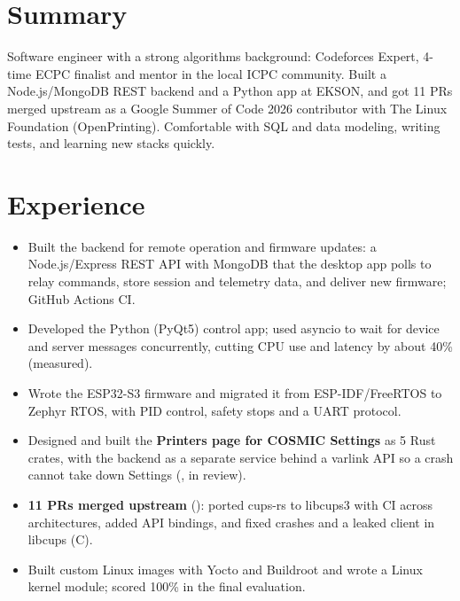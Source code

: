 \documentclass[10pt]{article}
\begin{document}

\section*{Summary}
Software engineer with a strong algorithms background: Codeforces Expert, 4-time ECPC finalist and mentor in the local ICPC community. Built a Node.js/MongoDB REST backend and a Python app at EKSON, and got 11 PRs merged upstream as a Google Summer of Code 2026 contributor with The Linux Foundation (OpenPrinting). Comfortable with SQL and data modeling, writing tests, and learning new stacks quickly.

\section*{Experience}
\begin{itemize}
  \item Built the backend for remote operation and firmware updates: a Node.js/Express REST API with MongoDB that the desktop app polls to relay commands, store session and telemetry data, and deliver new firmware; GitHub Actions CI.
  \item Developed the Python (PyQt5) control app; used asyncio to wait for device and server messages concurrently, cutting CPU use and latency by about 40\% (measured).
  \item Wrote the ESP32-S3 firmware and migrated it from ESP-IDF/FreeRTOS to Zephyr RTOS, with PID control, safety stops and a UART protocol.
\end{itemize}
\begin{itemize}
  \item Designed and built the \textbf{Printers page for COSMIC Settings} as 5 Rust crates, with the backend as a separate service behind a varlink API so a crash cannot take down Settings (, in review).
  \item \textbf{11 PRs merged upstream} (): ported cups-rs to libcups3 with CI across architectures, added API bindings, and fixed crashes and a leaked client in libcups (C).
\end{itemize}
\begin{itemize}
  \item Built custom Linux images with Yocto and Buildroot and wrote a Linux kernel module; scored 100\% in the final evaluation.
\end{itemize}
\end{document}
